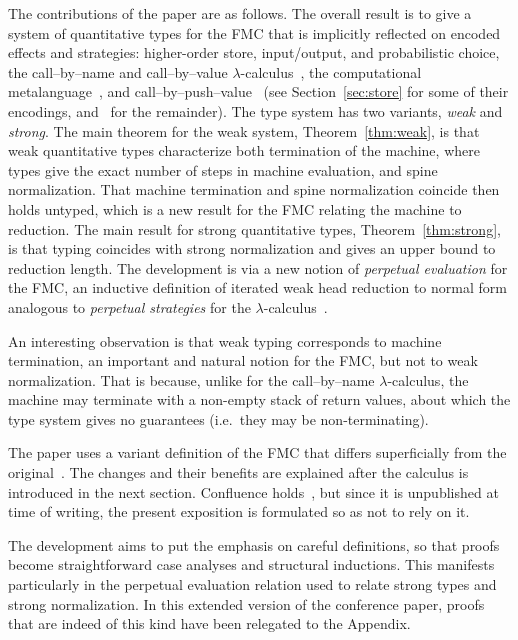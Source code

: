 \documentclass[a4paper,UKenglish,cleveref, autoref, thm-restate]{lipics-v2021}
\begin{document}
The contributions of the paper are as follows. The overall result is to give a system of quantitative types for the FMC that is implicitly reflected on encoded effects and strategies: higher-order store, input/output, and probabilistic choice, the call--by--name and call--by--value $\lambda$-calculus~\cite{Plotkin-1975}, the computational metalanguage~\cite{Moggi-1991}, and call--by--push--value~\cite{Levy-2003} (see Section~\ref{sec:store} for some of their encodings, and~\cite{Heijltjes-2022} for the remainder). The type system has two variants, \emph{weak} and \emph{strong}. The main theorem for the weak system, Theorem~\ref{thm:weak}, is that weak quantitative types characterize both termination of the machine, where types give the exact number of steps in machine evaluation, and spine normalization. That machine termination and spine normalization coincide then holds untyped, which is a new result for the FMC relating the machine to reduction. The main result for strong quantitative types, Theorem~\ref{thm:strong}, is that typing coincides with strong normalization and gives an upper bound to reduction length. The development is via a new notion of \emph{perpetual evaluation} for the FMC, an inductive definition of iterated weak head reduction to normal form analogous to \emph{perpetual strategies} for the $\lambda$-calculus~\cite{Barendregt-1984,Bergstra-Klop-1982,Raamsdonk-Severi-Sorensen-Xi-1999}. 

An interesting observation is that weak typing corresponds to machine termination, an important and natural notion for the FMC, but not to weak normalization. That is because, unlike for the call--by--name $\lambda$-calculus, the machine may terminate with a non-empty stack of return values, about which the type system gives no guarantees (i.e.\ they may be non-terminating).

The paper uses a variant definition of the FMC that differs superficially from the original~\cite{Heijltjes-2022}. The changes and their benefits are explained after the calculus is introduced in the next section. Confluence holds~\cite{Heijltjes-2025}, but since it is unpublished at time of writing, the present exposition is formulated so as not to rely on it.

The development aims to put the emphasis on careful definitions, so that proofs become straightforward case analyses and structural inductions. This manifests particularly in the perpetual evaluation relation used to relate strong types and strong normalization.  In this extended version of the conference paper, proofs that are indeed of this kind have been relegated to the Appendix.
\end{document}
